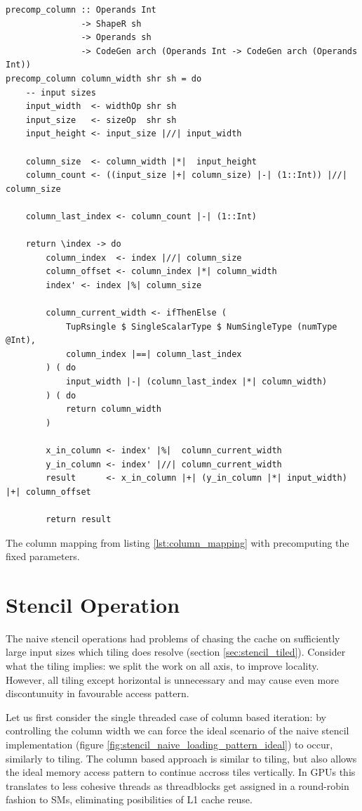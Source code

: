 \begin{listing}
    \begin{verbatim}
precomp_column :: Operands Int 
               -> ShapeR sh 
               -> Operands sh 
               -> CodeGen arch (Operands Int -> CodeGen arch (Operands Int))
precomp_column column_width shr sh = do
    -- input sizes
    input_width  <- widthOp shr sh
    input_size   <- sizeOp  shr sh
    input_height <- input_size |//| input_width
    
    column_size  <- column_width |*|  input_height
    column_count <- ((input_size |+| column_size) |-| (1::Int)) |//| column_size

    column_last_index <- column_count |-| (1::Int)

    return \index -> do
        column_index  <- index |//| column_size
        column_offset <- column_index |*| column_width
        index' <- index |%| column_size

        column_current_width <- ifThenElse (
            TupRsingle $ SingleScalarType $ NumSingleType (numType @Int), 
            column_index |==| column_last_index
        ) ( do
            input_width |-| (column_last_index |*| column_width)
        ) ( do
            return column_width
        )
        
        x_in_column <- index' |%|  column_current_width
        y_in_column <- index' |//| column_current_width
        result      <- x_in_column |+| (y_in_column |*| input_width) |+| column_offset

        return result
    \end{verbatim}
    \caption{
        The column mapping from listing \ref{lst:column_mapping} with precomputing the fixed parameters.
    }
    \label{lst:column_mapping_precompute}
\end{listing}

\section{Stencil Operation}

The naive stencil operations had problems of chasing the cache on sufficiently large input sizes which tiling does resolve (section \ref{sec:stencil_tiled}).
Consider what the tiling implies: we split the work on all axis, to improve locality.
However, all tiling except horizontal is unnecessary  and may cause even more discontunuity in favourable access pattern.

Let us first consider the single threaded case of column based iteration: by controlling the column width we can force the ideal scenario of the naive stencil implementation (figure \ref{fig:stencil_naive_loading_pattern_ideal}) to occur, similarly to tiling.
The column based approach is similar to tiling, but also allows the ideal memory access pattern to continue accross tiles vertically.
In GPUs this translates to less cohesive threads as threadblocks get assigned in a round-robin fashion to SMs, eliminating posibilities of L1 cache reuse.

